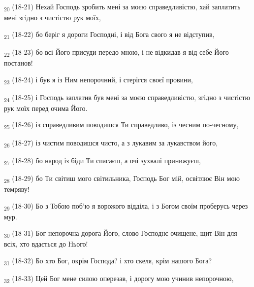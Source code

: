 \begin{tcolorbox}
\textsubscript{20} (18-21) Нехай Господь зробить мені за моєю справедливістю, хай заплатить мені згідно з чистістю рук моїх,
\end{tcolorbox}
\begin{tcolorbox}
\textsubscript{21} (18-22) бо беріг я дороги Господні, і від Бога свого я не відступив,
\end{tcolorbox}
\begin{tcolorbox}
\textsubscript{22} (18-23) бо всі Його присуди передо мною, і не відкидав я від себе Його постанов!
\end{tcolorbox}
\begin{tcolorbox}
\textsubscript{23} (18-24) і був я із Ним непорочний, і стерігся своєї провини,
\end{tcolorbox}
\begin{tcolorbox}
\textsubscript{24} (18-25) і Господь заплатив був мені за моєю справедливістю, згідно з чистістю рук моїх перед очима Його.
\end{tcolorbox}
\begin{tcolorbox}
\textsubscript{25} (18-26) із справедливим поводишся Ти справедливо, із чесним по-чесному,
\end{tcolorbox}
\begin{tcolorbox}
\textsubscript{26} (18-27) із чистим поводишся чисто, а з лукавим за лукавством його,
\end{tcolorbox}
\begin{tcolorbox}
\textsubscript{27} (18-28) бо народ із біди Ти спасаєш, а очі зухвалі принижуєш,
\end{tcolorbox}
\begin{tcolorbox}
\textsubscript{28} (18-29) бо Ти світиш мого світильника, Господь Бог мій, освітлює Він мою темряву!
\end{tcolorbox}
\begin{tcolorbox}
\textsubscript{29} (18-30) Бо з Тобою поб'ю я ворожого відділа, і з Богом своїм проберусь через мур.
\end{tcolorbox}
\begin{tcolorbox}
\textsubscript{30} (18-31) Бог непорочна дорога Його, слово Господнє очищене, щит Він для всіх, хто вдається до Нього!
\end{tcolorbox}
\begin{tcolorbox}
\textsubscript{31} (18-32) Бо хто Бог, окрім Господа? і хто скеля, крім нашого Бога?
\end{tcolorbox}
\begin{tcolorbox}
\textsubscript{32} (18-33) Цей Бог мене силою оперезав, і дорогу мою учинив непорочною,
\end{tcolorbox}
